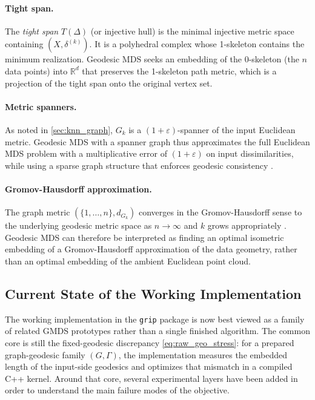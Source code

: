 \documentclass[twoside,11pt]{article}
\newcommand{\R}{\mathbb{R}}
\newcommand{\Gk}{G_k}
\begin{document}
\paragraph{Tight span.}
The \emph{tight span} $T(\Delta)$ (or injective hull)
\citep{dress1984trees, isbell1964six} is the minimal injective metric
space containing $(X, \delta^{(k)})$.  It is a polyhedral complex whose
1-skeleton contains the minimum realization.  Geodesic MDS seeks an
embedding of the 0-skeleton (the $n$ data points) into $\R^d$ that
preserves the 1-skeleton path metric, which is a projection of the
tight span onto the original vertex set.

\paragraph{Metric spanners.}
As noted in \cref{sec:knn_graph}, $\Gk$ is a $(1+\varepsilon)$-spanner
of the input Euclidean metric.  Geodesic MDS with a spanner graph thus
approximates the full Euclidean MDS problem with a multiplicative error
of $(1+\varepsilon)$ on input dissimilarities, while using a sparse graph
structure that enforces geodesic consistency \citep{althofer1993sparse}.

\paragraph{Gromov-Hausdorff approximation.}
The graph metric $(\{1,\ldots,n\}, d_{\Gk})$ converges in the
Gromov-Hausdorff sense to the underlying geodesic metric space as
$n \to \infty$ and $k$ grows appropriately
\citep{gromov1999metric, latschev2001riemannian, bernstein2000graph}.
Geodesic MDS can therefore be interpreted as finding an optimal isometric
embedding of a Gromov-Hausdorff approximation of the data geometry, rather
than an optimal embedding of the ambient Euclidean point cloud.

\subsection{Current State of the Working Implementation}
\label{sec:current_implementation}

The working implementation in the \texttt{grip} package is now best viewed as
a family of related GMDS prototypes rather than a single finished algorithm.
The common core is still the fixed-geodesic discrepancy
\cref{eq:raw_geo_stress}: for a prepared graph-geodesic family
$(G,\Gamma)$, the implementation measures the embedded length of the
input-side geodesics and optimizes that mismatch in a compiled C++ kernel.
Around that core, several experimental layers have been added in order to
understand the main failure modes of the objective.
\end{document}
